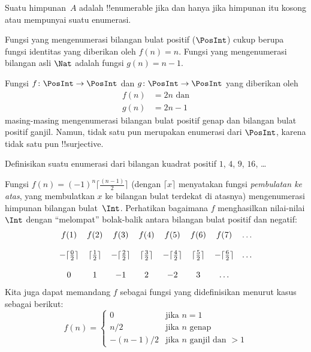 \documentclass[../../../include/open-logic-section]{subfiles}
\begin{document}
\begin{defn}
  Suatu himpunan~$A$ adalah !!{enumerable} jika dan hanya jika himpunan itu kosong atau
  mempunyai suatu enumerasi.
\end{defn}

\begin{ex}
Fungsi yang mengenumerasi bilangan bulat positif ($\PosInt$) cukup berupa
fungsi identitas yang diberikan oleh $f(n) = n$. Fungsi yang mengenumerasi
bilangan asli $\Nat$ adalah fungsi $g(n) = n - 1$.
\end{ex}

\begin{ex}
Fungsi $f\colon \PosInt \to \PosInt$ dan $g \colon \PosInt \to \PosInt$ yang
diberikan oleh
\begin{align*}
f(n) & = 2n \text{ dan}\\
g(n) & = 2n - 1
\end{align*}
masing-masing mengenumerasi bilangan bulat positif genap dan bilangan bulat
positif ganjil. Namun, tidak satu pun merupakan enumerasi dari $\PosInt$,
karena tidak satu pun !!{surjective}.
\end{ex}

\begin{prob}
Definisikan suatu enumerasi dari bilangan kuadrat positif $1$, $4$, $9$,
$16$, \dots
\end{prob}

\begin{ex}
Fungsi $f(n) = (-1)^{n} \lceil \frac{(n-1)}{2}\rceil$ (dengan $\lceil x
\rceil$ menyatakan fungsi \emph{pembulatan ke atas}, yang membulatkan $x$ ke
bilangan bulat terdekat di atasnya) mengenumerasi himpunan bilangan
bulat~$\Int$. Perhatikan bagaimana $f$ menghasilkan nilai-nilai $\Int$ dengan
``melompat'' bolak-balik antara bilangan bulat positif dan negatif:
\[
\begin{array}{c c c c c c c c}
f(1) & f(2) & f(3) & f(4) & f(5) & f(6) & f(7) & \dots \\ \\
- \lceil \tfrac{0}{2} \rceil & \lceil \tfrac{1}{2}\rceil & - \lceil \tfrac{2}{2} \rceil & \lceil \tfrac{3}{2} \rceil & - \lceil \tfrac{4}{2} \rceil  & \lceil \tfrac{5}{2}
\rceil & - \lceil \tfrac{6}{2} \rceil & \dots \\ \\
0 & 1 & -1 & 2 & -2 & 3 & \dots
\end{array}
\]
Kita juga dapat memandang $f$ sebagai fungsi yang didefinisikan menurut kasus
sebagai berikut:
\[
f(n) = \begin{cases}
  0 & \text{jika $n = 1$}\\
  n/2 & \text{jika $n$ genap}\\
  -(n-1)/2 & \text{jika $n$ ganjil dan $>1$}
  \end{cases}
\]
\end{ex}
\end{document}
